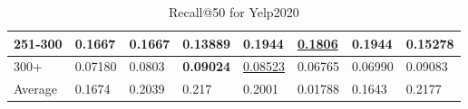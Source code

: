 \begin{table*}[]
\begin{tabular}{|l|l|l|l|l|l|l||l|}
        251-300   & 0.1667                         & 0.1667                         & 0.13889                        & \textbf{0.1944}                & \underline{0.1806}             & \textbf{0.1944}                 & 0.15278                    \\ \hline
        300+      & 0.07180                        & 0.0803                         & \textbf{0.09024}               & \underline{0.08523}            & 0.06765                        & 0.06990                         & 0.09083                    \\ \hline
        Average   & 0.1674                         & 0.2039                         & 0.217                          & 0.2001                         & 0.01788                        & 0.1643                          & 0.2177                     \\ \hline
    \end{tabular}
    \caption{Recall@50 for Yelp2020}
    \label{tab:yelp2020-recall-evaluation}
\end{table*}

